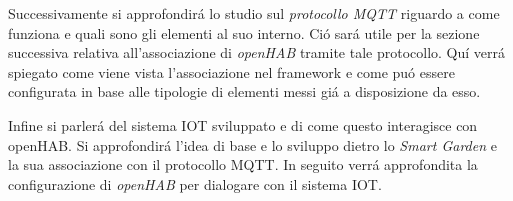 Successivamente si approfondir\'a lo studio sul {\em protocollo MQTT} riguardo a come funziona e quali sono gli elementi al suo interno. Ci\'o sar\'a utile per la sezione successiva relativa all'associazione di {\em openHAB} tramite tale protocollo. Qu\'i verr\'a spiegato come viene vista l'associazione nel framework e come pu\'o essere configurata in base alle tipologie di elementi messi gi\'a a disposizione da esso.

Infine si parler\'a del sistema IOT sviluppato e di come questo interagisce con openHAB. Si approfondir\'a l'idea di base e lo sviluppo dietro lo {\em Smart Garden} e la sua associazione con il protocollo MQTT. In seguito verr\'a approfondita la configurazione di {\em openHAB} per dialogare con il sistema IOT.